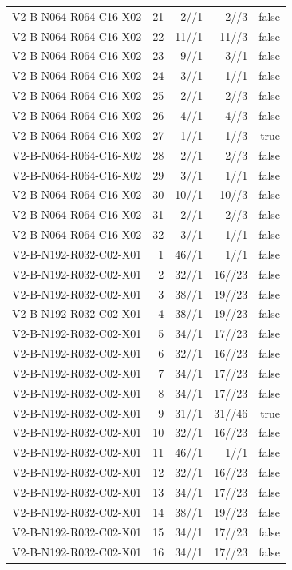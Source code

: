 {\begin{longtable}{lrrrr}
V2-B-N064-R064-C16-X02 & 21 & 2//1 & 2//3 & false \\
V2-B-N064-R064-C16-X02 & 22 & 11//1 & 11//3 & false \\
V2-B-N064-R064-C16-X02 & 23 & 9//1 & 3//1 & false \\
V2-B-N064-R064-C16-X02 & 24 & 3//1 & 1//1 & false \\
V2-B-N064-R064-C16-X02 & 25 & 2//1 & 2//3 & false \\
V2-B-N064-R064-C16-X02 & 26 & 4//1 & 4//3 & false \\
V2-B-N064-R064-C16-X02 & 27 & 1//1 & 1//3 & true \\
V2-B-N064-R064-C16-X02 & 28 & 2//1 & 2//3 & false \\
V2-B-N064-R064-C16-X02 & 29 & 3//1 & 1//1 & false \\
V2-B-N064-R064-C16-X02 & 30 & 10//1 & 10//3 & false \\
V2-B-N064-R064-C16-X02 & 31 & 2//1 & 2//3 & false \\
V2-B-N064-R064-C16-X02 & 32 & 3//1 & 1//1 & false \\
V2-B-N192-R032-C02-X01 & 1 & 46//1 & 1//1 & false \\
V2-B-N192-R032-C02-X01 & 2 & 32//1 & 16//23 & false \\
V2-B-N192-R032-C02-X01 & 3 & 38//1 & 19//23 & false \\
V2-B-N192-R032-C02-X01 & 4 & 38//1 & 19//23 & false \\
V2-B-N192-R032-C02-X01 & 5 & 34//1 & 17//23 & false \\
V2-B-N192-R032-C02-X01 & 6 & 32//1 & 16//23 & false \\
V2-B-N192-R032-C02-X01 & 7 & 34//1 & 17//23 & false \\
V2-B-N192-R032-C02-X01 & 8 & 34//1 & 17//23 & false \\
V2-B-N192-R032-C02-X01 & 9 & 31//1 & 31//46 & true \\
V2-B-N192-R032-C02-X01 & 10 & 32//1 & 16//23 & false \\
V2-B-N192-R032-C02-X01 & 11 & 46//1 & 1//1 & false \\
V2-B-N192-R032-C02-X01 & 12 & 32//1 & 16//23 & false \\
V2-B-N192-R032-C02-X01 & 13 & 34//1 & 17//23 & false \\
V2-B-N192-R032-C02-X01 & 14 & 38//1 & 19//23 & false \\
V2-B-N192-R032-C02-X01 & 15 & 34//1 & 17//23 & false \\
V2-B-N192-R032-C02-X01 & 16 & 34//1 & 17//23 & false \\

\end{longtable}}
